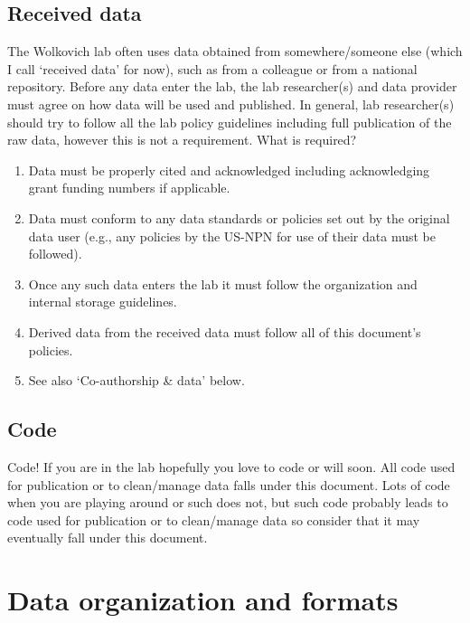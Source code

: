 \documentclass[11pt,a4paper,oneside]{article}
\begin{document}
\subsection{Received data} The Wolkovich lab often uses data obtained from somewhere/someone else (which I call `received data' for now), such as from a colleague or from a national repository. Before any data enter the lab, the lab researcher(s) and data provider must agree on how data will be used and published. In general, lab researcher(s) should try to follow all the lab policy guidelines including full publication of the raw data, however this is not a requirement. What is required? 
\begin{enumerate}
\item Data must be properly cited and acknowledged including acknowledging grant funding numbers if applicable. 
\item Data must conform to any data standards or policies set out by the original data user (e.g., any policies by the US-NPN for use of their data must be followed). 
\item Once any such data enters the lab it must follow the organization and internal storage guidelines. 
\item Derived data from the received data must follow all of this document's policies.
\item See also `Co-authorship \& data' below. 
\end{enumerate}

\subsection{Code} Code! If you are in the lab hopefully you love to code or will soon. All code used for publication or to clean/manage data falls under this document. Lots of code when you are playing around or such does not, but such code probably leads to code used for publication or to clean/manage data so consider that it may eventually fall under this document.

\section{Data organization and formats}
\end{document}
